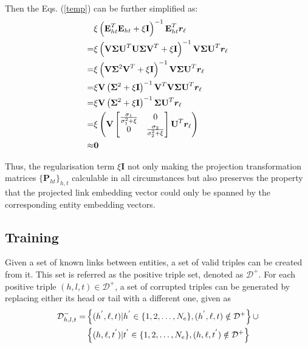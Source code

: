 \documentclass[10pt,journal]{IEEEtran}
\begin{document}
Then the Eqs. (\ref{temp}) can be further simplified as:
\begin{align}
& \xi \left(\textbf{E}_{ht}^{T} \textbf{E}_{ht} + \xi \textbf{I}\right )^{-1} \textbf{E}_{ht}^{T} \bm{r}_{\ell} \notag \\
=& \xi \left(\textbf{V} \mathbf{\Sigma} \textbf{U}^{T}  \textbf{U} \mathbf{\Sigma} \textbf{V}^{T} + \xi \textbf{I}\right )^{-1} \textbf{V} \mathbf{\Sigma} \textbf{U}^{T} \bm{r}_{\ell} \notag \\
=& \xi \left(\textbf{V} \mathbf{\Sigma}^2 \textbf{V}^{T} + \xi \textbf{I}\right )^{-1} \textbf{V} \mathbf{\Sigma} \textbf{U}^{T} \bm{r}_{\ell} \notag \\
=& \xi \textbf{V} \left(\mathbf{\Sigma}^2 + \xi \textbf{I} \right)^{-1} \textbf{V}^{T} \textbf{V} \mathbf{\Sigma} \textbf{U}^{T} \bm{r}_{\ell} \notag \\
=& \xi \textbf{V} \left(\mathbf{\Sigma}^2 + \xi \textbf{I} \right)^{-1} \mathbf{\Sigma} \textbf{U}^{T} \bm{r}_{\ell} \notag \\
=& \xi \left( \textbf{V} \begin{bmatrix} \frac{\sigma_1}{\sigma_1^2 + \xi} & 0 \\ 0 & \frac{\sigma_2}{\sigma_2^2 + \xi}   \end{bmatrix} \textbf{U}^{T} \bm{r}_{\ell}  \right)\notag \\
\approx & \bm{0}
\end{align}

Thus, the regularisation term $\xi \textbf{I}$ not only making the projection transformation matrices $\{\textbf{P}_{ht}\}_{h,t}$ calculable in all circumstances but also preserves the property that the projected link embedding vector  could only be spanned by the corresponding entity embedding vectors.

\subsection{Training}
Given a set of known links between entities, a set of valid triples can be created from it. This set is referred as the positive triple  set, denoted as $\mathcal{D}^+$. For each positive triple $(h,l,t)\in\mathcal{D}^+$, a set of  corrupted triples can be generated by replacing either its head or tail  with a different one, given as
\begin{align*}
\small
\mathcal{D}^{-}_{h,l,t} = &  \left\{ (h^{'},\ell,t)  |  h^{'} \in \{ 1,2,\ldots, N_e\}, (h^{'},\ell,t)\notin \mathcal{D}^+ \right\} \cup \\
 &  \left\{ (h,\ell,t^{'})  |   t^{'} \in \{ 1,2,\ldots, N_e\},  (h,\ell,t^{'}) \notin \mathcal{D}^+\right\}
\end{align*}
\end{document}
